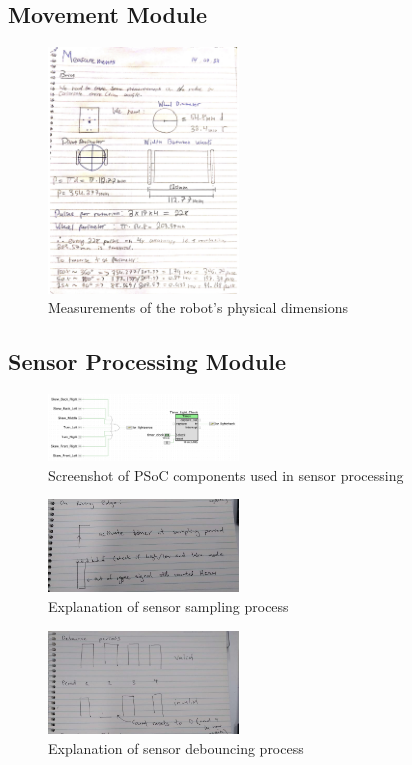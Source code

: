 \documentclass[conference]{IEEEtran}
\begin{document}
\subsection{Movement Module}

\begin{figure}[H]
	\centerline{\includegraphics[width=0.45\textwidth]{physical-measurements.png}}
	\caption{Measurements of the robot's physical dimensions}
	\label{fig:physical-dimensions}
\end{figure}

\subsection{Sensor Processing Module}

\begin{figure}[H]
	\centerline{\includegraphics[width=0.45\textwidth]{sensor-psoc.png}}
	\caption{Screenshot of PSoC components used in sensor processing}
	\label{fig:sensor-psoc}
\end{figure}

\begin{figure}[H]
	\centerline{\includegraphics[width=0.45\textwidth]{sensor-sampling.png}}
	\caption{Explanation of sensor sampling process}
	\label{fig:sensor-sampling}
\end{figure}
\begin{figure}[H]
	\centerline{\includegraphics[width=0.45\textwidth]{sensor-debouncing.png}}
	\caption{Explanation of sensor debouncing process}
	\label{fig:sensor-debouncing}
\end{figure}
\end{document}
